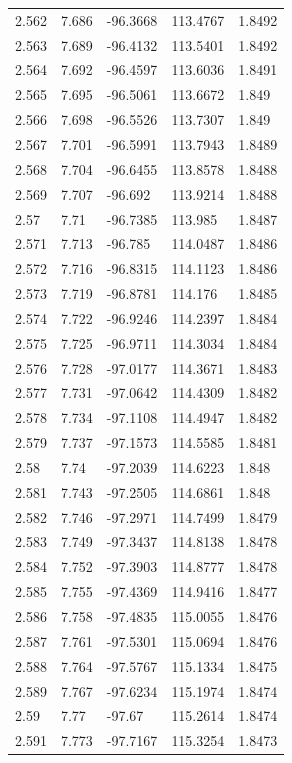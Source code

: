 \begin{tabular}{lllll}
2.562 & 7.686 & -96.3668 & 113.4767 & 1.8492 \\
2.563 & 7.689 & -96.4132 & 113.5401 & 1.8492 \\
2.564 & 7.692 & -96.4597 & 113.6036 & 1.8491 \\
2.565 & 7.695 & -96.5061 & 113.6672 & 1.849 \\
2.566 & 7.698 & -96.5526 & 113.7307 & 1.849 \\
2.567 & 7.701 & -96.5991 & 113.7943 & 1.8489 \\
2.568 & 7.704 & -96.6455 & 113.8578 & 1.8488 \\
2.569 & 7.707 & -96.692 & 113.9214 & 1.8488 \\
2.57 & 7.71 & -96.7385 & 113.985 & 1.8487 \\
2.571 & 7.713 & -96.785 & 114.0487 & 1.8486 \\
2.572 & 7.716 & -96.8315 & 114.1123 & 1.8486 \\
2.573 & 7.719 & -96.8781 & 114.176 & 1.8485 \\
2.574 & 7.722 & -96.9246 & 114.2397 & 1.8484 \\
2.575 & 7.725 & -96.9711 & 114.3034 & 1.8484 \\
2.576 & 7.728 & -97.0177 & 114.3671 & 1.8483 \\
2.577 & 7.731 & -97.0642 & 114.4309 & 1.8482 \\
2.578 & 7.734 & -97.1108 & 114.4947 & 1.8482 \\
2.579 & 7.737 & -97.1573 & 114.5585 & 1.8481 \\
2.58 & 7.74 & -97.2039 & 114.6223 & 1.848 \\
2.581 & 7.743 & -97.2505 & 114.6861 & 1.848 \\
2.582 & 7.746 & -97.2971 & 114.7499 & 1.8479 \\
2.583 & 7.749 & -97.3437 & 114.8138 & 1.8478 \\
2.584 & 7.752 & -97.3903 & 114.8777 & 1.8478 \\
2.585 & 7.755 & -97.4369 & 114.9416 & 1.8477 \\
2.586 & 7.758 & -97.4835 & 115.0055 & 1.8476 \\
2.587 & 7.761 & -97.5301 & 115.0694 & 1.8476 \\
2.588 & 7.764 & -97.5767 & 115.1334 & 1.8475 \\
2.589 & 7.767 & -97.6234 & 115.1974 & 1.8474 \\
2.59 & 7.77 & -97.67 & 115.2614 & 1.8474 \\
2.591 & 7.773 & -97.7167 & 115.3254 & 1.8473 \\

\end{tabular}

